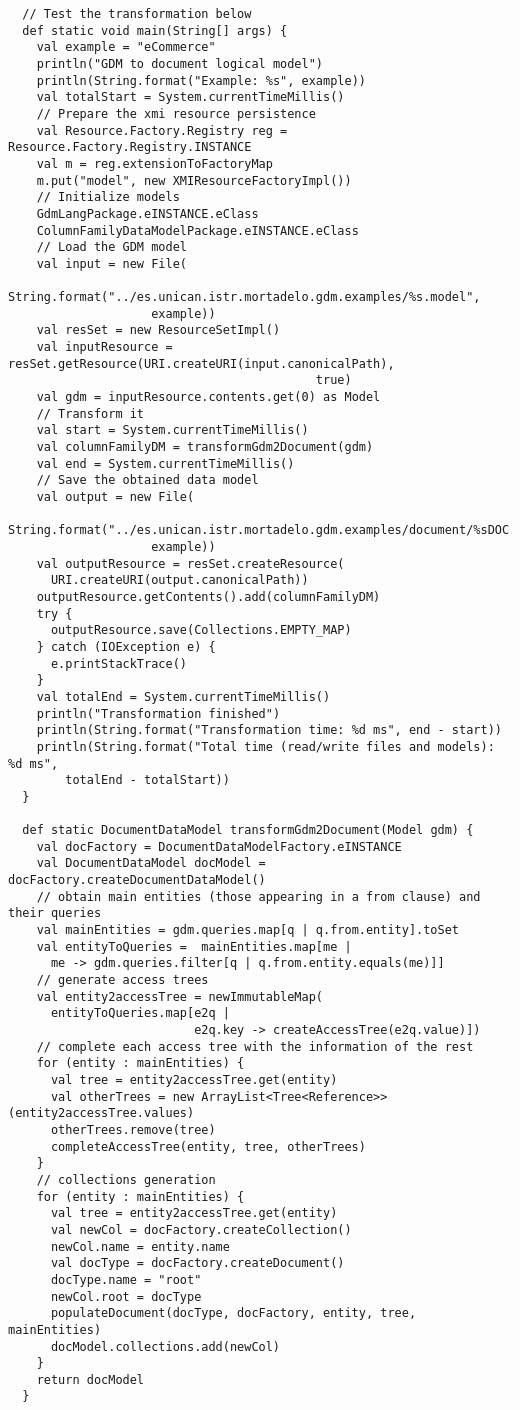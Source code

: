 \begin{code}
\begin{verbatim}
  // Test the transformation below
  def static void main(String[] args) {
    val example = "eCommerce"
    println("GDM to document logical model")
    println(String.format("Example: %s", example))
    val totalStart = System.currentTimeMillis()
    // Prepare the xmi resource persistence
    val Resource.Factory.Registry reg = Resource.Factory.Registry.INSTANCE
    val m = reg.extensionToFactoryMap
    m.put("model", new XMIResourceFactoryImpl())
    // Initialize models
    GdmLangPackage.eINSTANCE.eClass
    ColumnFamilyDataModelPackage.eINSTANCE.eClass
    // Load the GDM model
    val input = new File(
      String.format("../es.unican.istr.mortadelo.gdm.examples/%s.model",
                    example))
    val resSet = new ResourceSetImpl()
    val inputResource = resSet.getResource(URI.createURI(input.canonicalPath),
                                           true)
    val gdm = inputResource.contents.get(0) as Model
    // Transform it
    val start = System.currentTimeMillis()
    val columnFamilyDM = transformGdm2Document(gdm)
    val end = System.currentTimeMillis()
    // Save the obtained data model
    val output = new File(
      String.format("../es.unican.istr.mortadelo.gdm.examples/document/%sDOC.model",
                    example))
    val outputResource = resSet.createResource(
      URI.createURI(output.canonicalPath))
    outputResource.getContents().add(columnFamilyDM)
    try {
      outputResource.save(Collections.EMPTY_MAP)
    } catch (IOException e) {
      e.printStackTrace()
    }
    val totalEnd = System.currentTimeMillis()
    println("Transformation finished")
    println(String.format("Transformation time: %d ms", end - start))
    println(String.format("Total time (read/write files and models): %d ms",
        totalEnd - totalStart))
  }

  def static DocumentDataModel transformGdm2Document(Model gdm) {
    val docFactory = DocumentDataModelFactory.eINSTANCE
    val DocumentDataModel docModel = docFactory.createDocumentDataModel()
    // obtain main entities (those appearing in a from clause) and their queries
    val mainEntities = gdm.queries.map[q | q.from.entity].toSet
    val entityToQueries =  mainEntities.map[me |
      me -> gdm.queries.filter[q | q.from.entity.equals(me)]]
    // generate access trees
    val entity2accessTree = newImmutableMap(
      entityToQueries.map[e2q |
                          e2q.key -> createAccessTree(e2q.value)])
    // complete each access tree with the information of the rest
    for (entity : mainEntities) {
      val tree = entity2accessTree.get(entity)
      val otherTrees = new ArrayList<Tree<Reference>> (entity2accessTree.values)
      otherTrees.remove(tree)
      completeAccessTree(entity, tree, otherTrees)
    }
    // collections generation
    for (entity : mainEntities) {
      val tree = entity2accessTree.get(entity)
      val newCol = docFactory.createCollection()
      newCol.name = entity.name
      val docType = docFactory.createDocument()
      docType.name = "root"
      newCol.root = docType
      populateDocument(docType, docFactory, entity, tree, mainEntities)
      docModel.collections.add(newCol)
    }
    return docModel
  }


\end{verbatim}
\end{code}
